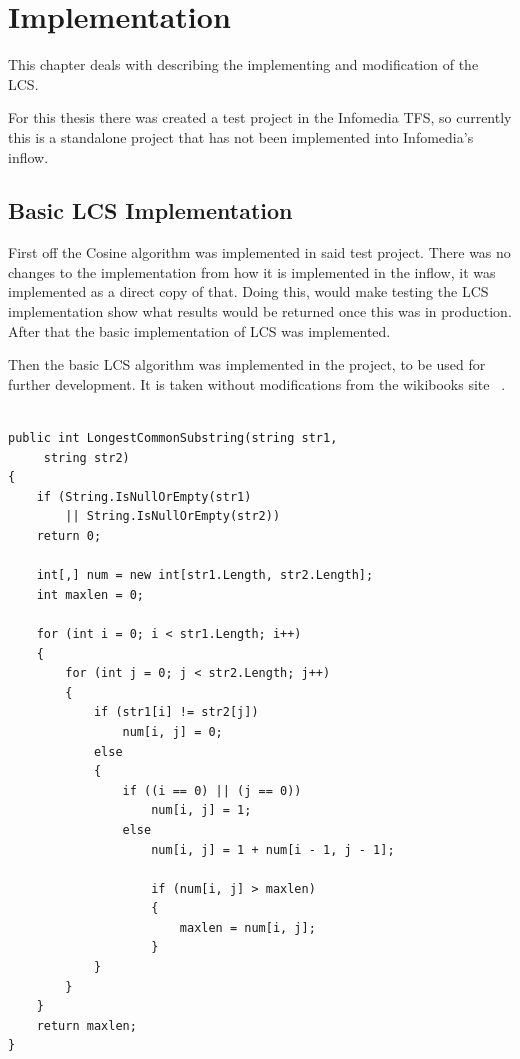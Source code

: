 \chapter{Implementation}

This chapter deals with describing the implementing and modification of the LCS.

For this thesis there was created a test project in the Infomedia TFS, so currently this is a standalone project that has not been implemented into Infomedia's inflow.

\section{Basic LCS Implementation}
First off the Cosine algorithm was implemented in said test project. There was no changes to the implementation from how it is implemented in the inflow, it was implemented as a direct copy of that. Doing this, would make testing the LCS implementation show what results would be returned once this was in production. After that the basic implementation of LCS was implemented.

Then the basic LCS algorithm was implemented in the project, to be used for further development. It is taken without modifications from the wikibooks site ~\cite{WikiLCS}.

\lstset{style=sharpc}
\begin{lstlisting}[caption=Basic LCS implementation in C$^\sharp$, captionpos=b]

public int LongestCommonSubstring(string str1,
	 string str2)
{
    if (String.IsNullOrEmpty(str1) 
    	|| String.IsNullOrEmpty(str2))
    return 0;
	
	int[,] num = new int[str1.Length, str2.Length];
	int maxlen = 0;

    for (int i = 0; i < str1.Length; i++)
  	{
    	for (int j = 0; j < str2.Length; j++)
        {
        	if (str1[i] != str2[j])
            	num[i, j] = 0;
            else
            {
            	if ((i == 0) || (j == 0))
                	num[i, j] = 1;
                else
                    num[i, j] = 1 + num[i - 1, j - 1];

                    if (num[i, j] > maxlen)
                    {
                    	maxlen = num[i, j];
                  	}
           	}
     	}
	}
    return maxlen;
}

\end{lstlisting}

